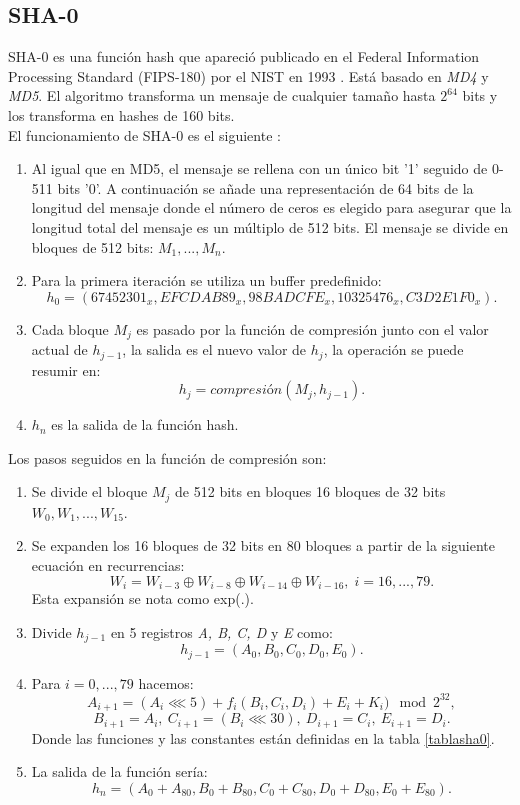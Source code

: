 \begin{aligned*}
\subsection{SHA-0}
SHA-0 es una función hash que apareció publicado en el Federal Information Processing Standard (FIPS-180) por el NIST en 1993 \cite{Penard2008}. Está basado en \emph{MD4} y \emph{MD5}. El algoritmo transforma un mensaje de cualquier tamaño hasta $2^{64}$ bits y los transforma en hashes de 160 bits.\\
El funcionamiento de SHA-0 es el siguiente \cite{sha0}:
\begin{enumerate}
	\item Al igual que en MD5, el mensaje se rellena con un único bit '1' seguido de 0-511 bits '0'. A continuación se añade una representación de 64 bits de la longitud del mensaje donde el número de ceros es elegido para asegurar que la longitud total del mensaje es un múltiplo de 512 bits. El mensaje se divide en bloques de 512 bits: $M_1,...,M_n$.
	\item Para la primera iteración se utiliza un buffer predefinido:
	$$
		h_0=(67452301_x, EFCDAB89_x, 98BADCFE_x, 10325476_x, C3D2E1F0_x).
	$$
	\item Cada bloque $M_j$ es pasado por la función de compresión junto con el valor actual de $h_{j-1}$, la salida es el nuevo valor de $h_j$, la operación se puede resumir en:
	$$
		h_j=compresión(M_j,h_{j-1}).
	$$
	\item $h_n$ es la salida de la función hash.
\end{enumerate}
Los pasos seguidos en la función de compresión son:
\begin{enumerate}
	\item Se divide el bloque $M_j$ de 512 bits en bloques 16 bloques de 32 bits $W_0,W_1,...,W_{15}$. 
	\item Se expanden los 16 bloques de 32 bits en 80 bloques a partir de la siguiente ecuación en recurrencias:
	$$
		W_i=W_{i-3}\oplus W_{i-8}\oplus W_{i-14}\oplus W_{i-16},\; i=16,...,79.
	$$
	Esta expansión se nota como exp(.).
	\item Divide $h_{j-1}$ en 5 registros \emph{A, B, C, D} y \emph{E} como:
	$$
		h_{j-1} = (A_0, B_0, C_0, D_0, E_0).
	$$
	\item Para $i=0,...,79$ hacemos:
	$$
		A_{i+1}=(A_i\lll5)+f_i(B_i,C_i,D_i)+E_i+K_i) \mod 2^{32},
	$$
	$$
		B_{i+1}=A_i,\: C_{i+1}=(B_i\lll30),\: D_{i+1}=C_i,\: E_{i+1}=D_i.
	$$
	Donde las funciones y las constantes están definidas en la tabla \ref{tablasha0}.
	\item La salida de la función sería:
	$$
		h_n=(A_0+A_{80}, B_0+B_{80}, C_0+C_{80}, D_0+D_{80}, E_0+E_{80}).
	$$
\end{enumerate}


\end{aligned*}
